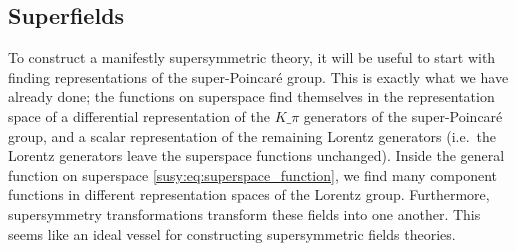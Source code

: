 \documentclass[../main.tex]{subfiles}
\begin{document}


\subsection{Superfields}
To construct a manifestly supersymmetric theory, it will be useful to start with finding representations of the super-Poincaré group.
This is exactly what we have already done; the functions on superspace find themselves in the representation space of a differential representation of the \(K\_\pi\) generators of the super-Poincaré group, and a scalar representation of the remaining Lorentz generators (i.e.\ the Lorentz generators leave the superspace functions unchanged).
Inside the general function on superspace \cref{susy:eq:superspace_function}, we find many component functions in different representation spaces of the Lorentz group.
Furthermore, supersymmetry transformations transform these fields into one another.
This seems like an ideal vessel for constructing supersymmetric fields theories.
\end{document}
